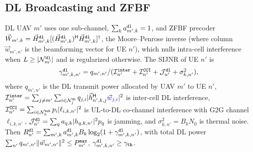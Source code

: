 \documentclass[journal]{IEEEtran}
\begin{document}
\subsection{DL Broadcasting and ZFBF}
\label{sec:dl}
DL UAV $m'$ uses one sub-channel, $\sum_k a_{m',k}^{\tt dl}=1$, and ZFBF precoder $\vec{W}_{m',k}=\vec{H}_{m',k}^{\tt dl}[(\vec{H}_{m',k}^{\tt dl})^{\sf H}\vec{H}_{m',k}^{\tt dl}]^{\dagger}$, the Moore--Penrose inverse {\color{blue}(where column $\vec{w}_{m',n'}$ is the beamforming vector for UE $n'$)}, which nulls intra-cell interference when $L\ge|\mathcal{N}_{m'}^{\tt dl}|$ and is regularized otherwise. The SIJNR of UE $n'$ is
\begin{equation}
\textstyle\gamma_{m',k,n'}^{\tt dl}=q_{m',n'}/(\mathcal{I}_{n'}^{\tt inter}+\mathcal{I}_{n'}^{\tt CCI}+\mathcal{J}_{n'}^{\tt dl}+\sigma_{k,n'}^2),
\label{eq:dl_sijnr}
\end{equation}
where {\color{blue}$q_{m',n'}$ is the DL transmit power allocated by UAV $m'$ to UE $n'$}, $\mathcal{I}_{n'}^{\tt inter}=\sum_{j\neq m'}\sum_{i\in\mathcal{N}_j^{\tt dl}}q_{j,i}|\vec{h}_{n',k,j}^{\sf H}{\color{blue}\vec{w}_{j,i}}|^2$ is inter-cell DL interference,
$\mathcal{I}_{n'}^{\tt CCI}=\sum_{i\in\mathcal{N}_k^{\tt sub}}p_i|\ell_{i,k,n'}|^2$ is UL-to-DL co-channel interference with G2G channel $\ell_{i,k,n'}$,
$\mathcal{J}_{n'}^{\tt dl}=\sum_{q}a_{q,k}|h_{q,k,n'}|^2 p_q$ is jamming, and
$\sigma_{k,n'}^2=B_k N_0$ is thermal noise.
Then $R_{n'}^{\tt dl}=\sum_{m',k}a_{m',k}^{\tt dl}B_k\log_2(1+\gamma_{m',k,n'}^{\tt dl})$, with total DL power $\sum_{n'}q_{m',n'}\Vert\vec{w}_{m',n'}\Vert^2\le P_{m'}^{\tt max}$, $\gamma_{m',k,n'}^{\tt dl}\ge\gamma_{\tt th}$.
\end{document}
